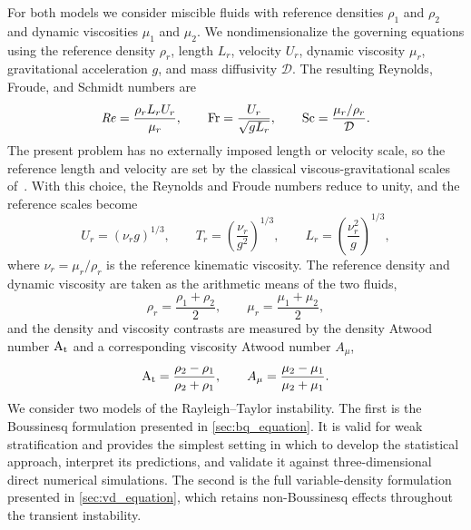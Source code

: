 For both models we consider miscible fluids with reference densities \(\rho_1\) and \(\rho_2\)
and dynamic viscosities \(\mu_1\) and \(\mu_2\). We nondimensionalize the governing equations using the reference density
\(\rho_r\), length \(L_r\), velocity \(U_r\), dynamic viscosity \(\mu_r\), gravitational
acceleration \(g\), and mass diffusivity \(\mathcal{D}\). The resulting Reynolds, Froude, and Schmidt numbers
are
\begin{equation}
    \label{eq:Re_Fr_definitions}
    \mathit{Re} = \frac{\rho_r L_r U_r}{\mu_r}, \qquad \mathrm{Fr} = \frac{U_r}{\sqrt{g L_r}}, \qquad \mathrm{Sc} = \frac{\mu_r/\rho_r}{\mathcal{D}}.
\end{equation}
The present problem has no externally imposed length or velocity scale, so the reference length and velocity are set by the classical viscous-gravitational scales
of~\citet{chandrasekhar-1961}. With this choice, the Reynolds and Froude numbers reduce to unity, and the reference scales become
\begin{equation}
    \label{eq:chandrasekhar_scaling}
    U_r = (\nu_r g)^{1/3}, \qquad T_r = \left(\frac{\nu_r}{g^{2}}\right)^{1/3}, \qquad L_r = \left(\frac{\nu_r^{2}}{g}\right)^{1/3},
\end{equation}
where \(\nu_r=\mu_r/\rho_r\) is the reference kinematic viscosity. The reference density
and dynamic viscosity are taken as the arithmetic means of the two fluids,
\begin{equation}
    \label{eq:reference_quantities}
    \rho_r = \frac{\rho_1 + \rho_2}{2}, \qquad \mu_r = \frac{\mu_1 + \mu_2}{2},
\end{equation}
and the density and viscosity contrasts are measured by the density Atwood number \(\mathrm{A_t}\) and a corresponding viscosity Atwood number \(A_{\mu}\),
\begin{equation}
    \label{eq:atwood_numbers}
    \mathrm{A_t} = \frac{\rho_2 - \rho_1}{\rho_2 + \rho_1}, \qquad A_{\mu} = \frac{\mu_2 - \mu_1}{\mu_2 + \mu_1}.
\end{equation}
We consider two models of the Rayleigh--Taylor instability. The first is the Boussinesq formulation presented in \cref{sec:bq_equation}. It is valid for weak stratification and provides the simplest setting in which to develop the statistical approach, interpret its predictions, and validate it against three-dimensional direct numerical simulations. The second is the full variable-density formulation presented in \cref{sec:vd_equation}, which retains non-Boussinesq effects throughout the transient instability.

